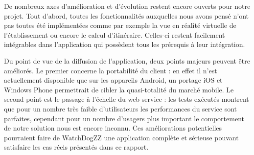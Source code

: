 De nombreux axes d’amélioration et d’évolution restent encore ouverts pour notre projet. Tout d’abord, toutes les fonctionnalités auxquelles nous avons pensé n’ont pas toutes été implémentées comme par exemple la vue en réalité virtuelle de l’établissement ou encore le calcul d’itinéraire. Celles-ci restent facilement intégrables dans l’application qui possèdent tous les prérequis à leur intégration.

Du point de vue de la diffusion de l'application, deux points majeurs peuvent être améliorés. Le premier concerne la portabilité du client : en effet il n’est actuellement disponible que sur les appareils Android, un portage iOS et Windows Phone permettrait de cibler la quasi-totalité du marché mobile. Le second point est le passage à l’échelle du web service : les tests exécutés montrent que pour un nombre très faible d’utilisateurs les performances du service sont parfaites, cependant pour un nombre d’usagers plus important le comportement de notre solution nous est encore inconnu. Ces améliorations potentielles pourraient faire de WatchDogZZ une application complète et sérieuse pouvant satisfaire les cas réels présentés dans ce rapport.
